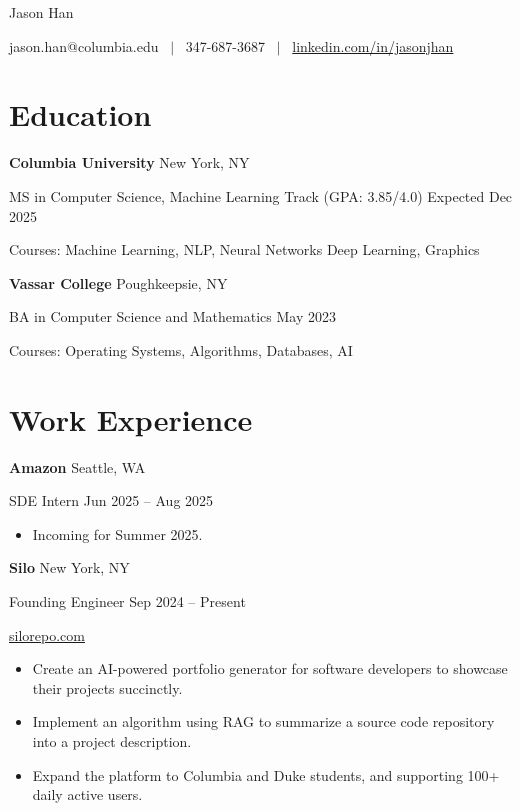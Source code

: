 \documentclass[11pt]{article}
\newcommand{\resumeentry}[4]{%
\textbf{#1} \hfill {\small #2}
\par
{\small #3} \hfill {\small #4}}
\begin{document}
{\centering%
{\huge Jason Han \par}
\medskip
{jason.han@columbia.edu ~$\vert$~ {\small 347-687-3687} ~$\vert$~ \href{https://www.linkedin.com/in/jasonjhan/}{linkedin.com/in/jasonjhan} \par}}

\section{Education}
\resumeentry{Columbia University}{New York, NY}{MS in Computer Science, Machine Learning Track (GPA: 3.85/4.0)}{Expected Dec 2025}

{\small Courses: Machine Learning, NLP, Neural Networks Deep Learning, Graphics}


\smallskip

\resumeentry{Vassar College}{Poughkeepsie, NY}{BA in Computer Science and Mathematics}{May 2023}

{\small Courses: Operating Systems, Algorithms, Databases, AI}

\section{Work Experience}
\resumeentry{Amazon}{Seattle, WA}{SDE Intern}{Jun 2025 -- Aug 2025}
\begin{itemize}
  \item Incoming for Summer 2025.
\end{itemize}

\smallskip

\resumeentry{Silo}{New York, NY}{Founding Engineer}{Sep 2024 -- Present}

{\small \href{https://www.silorepo.com/}{silorepo.com}}

\begin{itemize}
  \item Create an AI-powered portfolio generator for software developers to showcase their projects succinctly.
  \item Implement an algorithm using RAG to summarize a source code repository into a project description.
  \item Expand the platform to Columbia and Duke students, and supporting 100+ daily active users.
\end{itemize}
\end{document}
